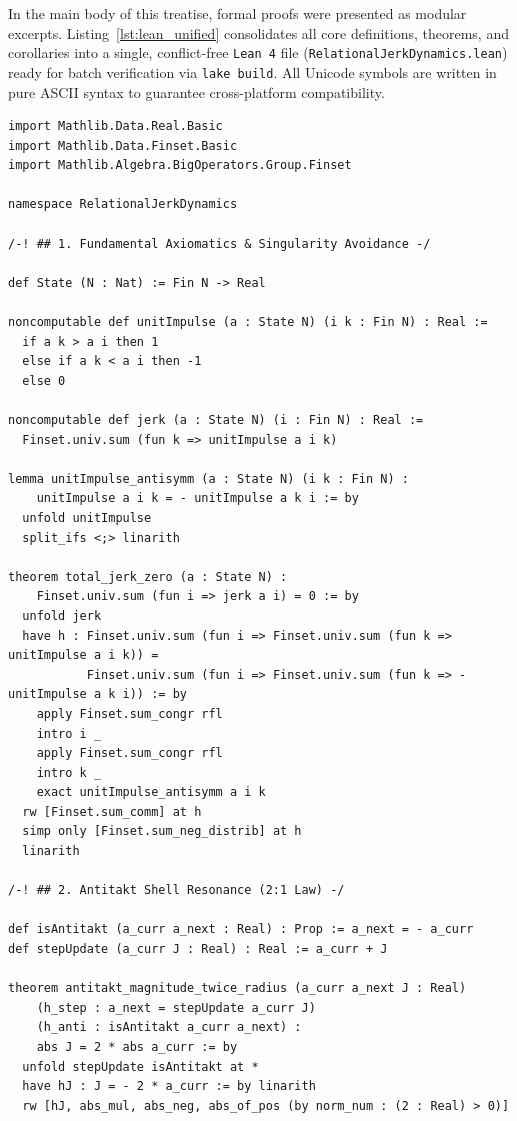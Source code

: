 \documentclass[11pt,a4paper]{article}
\theoremstyle{plain}
\theoremstyle{definition}
\theoremstyle{remark}
\begin{document}
In the main body of this treatise, formal proofs were presented as modular excerpts. Listing~\ref{lst:lean_unified} consolidates all core definitions, theorems, and corollaries into a single, conflict-free \texttt{Lean 4} file (\texttt{RelationalJerkDynamics.lean}) ready for batch verification via \texttt{lake build}. All Unicode symbols are written in pure ASCII syntax to guarantee cross-platform compatibility.

\begin{lstlisting}[caption={Complete, unified Lean 4 module verifying all core theorems of Relational Jerk Dynamics.},label={lst:lean_unified}]
import Mathlib.Data.Real.Basic
import Mathlib.Data.Finset.Basic
import Mathlib.Algebra.BigOperators.Group.Finset

namespace RelationalJerkDynamics

/-! ## 1. Fundamental Axiomatics & Singularity Avoidance -/

def State (N : Nat) := Fin N -> Real

noncomputable def unitImpulse (a : State N) (i k : Fin N) : Real :=
  if a k > a i then 1
  else if a k < a i then -1
  else 0

noncomputable def jerk (a : State N) (i : Fin N) : Real :=
  Finset.univ.sum (fun k => unitImpulse a i k)

lemma unitImpulse_antisymm (a : State N) (i k : Fin N) :
    unitImpulse a i k = - unitImpulse a k i := by
  unfold unitImpulse
  split_ifs <;> linarith

theorem total_jerk_zero (a : State N) :
    Finset.univ.sum (fun i => jerk a i) = 0 := by
  unfold jerk
  have h : Finset.univ.sum (fun i => Finset.univ.sum (fun k => unitImpulse a i k)) =
           Finset.univ.sum (fun i => Finset.univ.sum (fun k => - unitImpulse a k i)) := by
    apply Finset.sum_congr rfl
    intro i _
    apply Finset.sum_congr rfl
    intro k _
    exact unitImpulse_antisymm a i k
  rw [Finset.sum_comm] at h
  simp only [Finset.sum_neg_distrib] at h
  linarith

/-! ## 2. Antitakt Shell Resonance (2:1 Law) -/

def isAntitakt (a_curr a_next : Real) : Prop := a_next = - a_curr
def stepUpdate (a_curr J : Real) : Real := a_curr + J

theorem antitakt_magnitude_twice_radius (a_curr a_next J : Real)
    (h_step : a_next = stepUpdate a_curr J)
    (h_anti : isAntitakt a_curr a_next) :
    abs J = 2 * abs a_curr := by
  unfold stepUpdate isAntitakt at *
  have hJ : J = - 2 * a_curr := by linarith
  rw [hJ, abs_mul, abs_neg, abs_of_pos (by norm_num : (2 : Real) > 0)]


\end{lstlisting}
\end{document}
